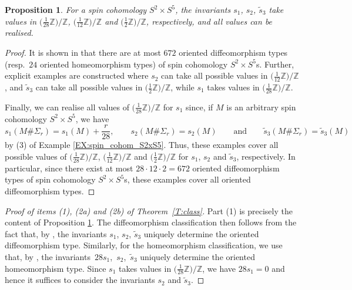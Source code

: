 \documentclass[10pt,a4paper]{amsart}
\numberwithin{equation}{section}
\newtheorem{Proposition}[Theorem]{Proposition}
\theoremstyle{definition}
\numberwithin{table}{section}
\newcommand{\Z}{\mathbb{Z}}
\begin{document}
\begin{Proposition}\label{P:s_i_values}
	For a spin cohomology $S^2\times S^5$, the invariants $s_1$, $s_2$, $\tilde{s}_3$ take values in $\bigl(\frac{1}{28}\Z\bigr)/\Z$, $\bigl(\frac{1}{12}\Z\bigr)/\Z$ and $\bigl(\frac{1}{2}\Z\bigr)/\Z$, respectively, and all values can be realised. %
\end{Proposition}
\begin{proof}
	It is shown in \cite[Section 5]{Wa22} that there are at most $672$ oriented diffeomorphism types (resp.\ $24$ oriented homeomorphism types) of spin cohomology $S^2\times S^5$s. Further, explicit examples are constructed where $s_2$ can take all possible values in $\bigl(\frac{1}{12}\Z\bigr)/\Z$, and $\tilde{s}_3$ can take all possible values in $\bigl(\frac{1}{2}\Z\bigr)/\Z$, while $s_1$ takes values in $\bigl(\frac{1}{28}\Z\bigr)/\Z$.
	
	Finally, we can realise all values of $\bigl(\frac{1}{28}\Z\bigr)/\Z$ for $s_1$ since, if $M$ is an arbitrary spin cohomology $S^2\times S^5$, we have
	\[ s_1(M\#\Sigma_r)=s_1(M)+\frac{r}{28}, \qquad s_2(M\#\Sigma_r)=s_2(M)\qquad  \text{and}\qquad \tilde{s}_3(M\#\Sigma_r)=\tilde{s}_3(M) \]
	by (3) of Example \ref{EX:spin_cohom_S2xS5}. Thus, these examples cover all possible values of $\bigl(\frac{1}{28}\Z\bigr)/\Z$, $\bigl(\frac{1}{12}\Z\bigr)/\Z$ and $\bigl(\frac{1}{2}\Z\bigr)/\Z$ for $s_1$, $s_2$ and $\tilde{s}_3$, respectively. In particular, since there exist at most $28\cdot 12\cdot 2=672$ oriented diffeomorphism types of spin cohomology $S^2\times S^5$s, these examples cover all oriented diffeomorphism types.
\end{proof}

\begin{proof}[Proof of items (1), (2a) and (2b) of Theorem~\ref{T:class}]
	Part (1) is precisely the content of Proposition \ref{P:s_i_values}. The diffeomorphism classification then follows from the fact that, by \cite[Theorem 1]{KS98}, the invariants $s_1$, $s_2$, $\tilde{s}_3$ uniquely determine the oriented diffeomorphism type. Similarly, for the homeomorphism classification, we use that, by \cite[Theorem 1]{KS98}, the invariants~$28s_1$,~$s_2$,~$\tilde{s}_3$ uniquely determine the oriented homeomorphism type. Since $s_1$ takes values in $\bigl(\frac{1}{28}\Z\bigr)/\Z$, we have $28s_1=0$ and hence it suffices to consider the invariants $s_2$ and $\tilde{s}_3$.
\end{proof}
\end{document}
